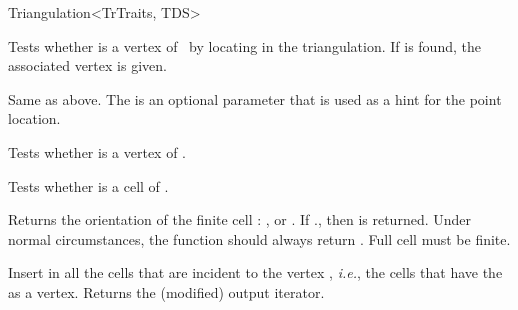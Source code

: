 \begin{ccRefClass}{Triangulation<TrTraits, TDS>}








 {Tests
whether  is a vertex of \ccVar\ by locating  in the triangulation.  If
 is found, the associated vertex  is given.}

\ccGlue{} {Same as above.  The  is
an optional parameter that is used as a hint for the point location.}

\ccGlue{}
{Tests whether  is a vertex of \ccVar.}

{Tests whether  is a cell of \ccVar.}

{Returns the orientation of the finite cell :
\ccGlobalScope{}, \ccGlobalScope{} or
\ccGlobalScope{}. If \ccVar., then
\ccGlobalScope{} is returned. Under normal circumstances, the function
should always return \ccGlobalScope{}.
\ccPrecond Full cell  must be finite.
}

{Insert in  all the cells that are incident to the vertex
, \emph{i.e.}, the cells that have the  as a vertex.
Returns the (modified) output iterator.
}


\end{ccRefClass}
